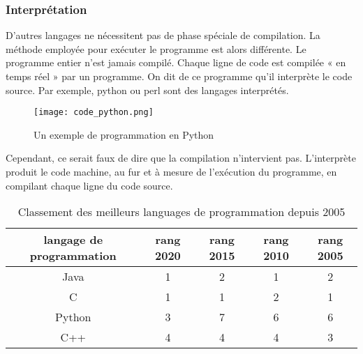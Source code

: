 \documentclass[12pt,a4paper]{article}
\begin{document}
    \subsubsection{Interprétation}
    D'autres langages ne nécessitent pas de phase spéciale de compilation. La méthode employée pour exécuter le programme est alors différente. Le programme entier n'est jamais compilé. Chaque ligne de code est compilée « en temps réel » par un programme. On dit de ce programme qu'il interprète le code source. Par exemple, python ou perl sont des langages interprétés.\\
    
    
    \begin{figure}[ht]
        \centering
        \texttt{[image: code\_python.png]}
        \caption{Un exemple de programmation en Python}
        \label{fig:Un exemple de programmation en Python}
    \end{figure}
    
    
    \newpage
    
    
    Cependant, ce serait faux de dire que la compilation n'intervient pas. 
    L'interprète produit le code machine, au fur et à mesure de l'exécution
    du programme, en compilant chaque ligne du code source.\\


    \begin{table}
        \centering
        \begin{tabular}{ c  c  c  c  c } \\ 
            \hline
            langage de programmation & rang 2020 & rang 2015 & rang 2010 & rang 2005 \\
            \hline
            Java    & 1 & 2 & 1 & 2 \\ 
            \hline
            C       & 1 & 1 & 2 & 1 \\ 
            \hline
            Python  & 3 & 7 & 6 & 6 \\ 
            \hline
            C++     & 4 & 4 & 4 & 3 \\ 
            \hline
        \end{tabular}
        \caption{Classement des meilleurs languages de programmation depuis 2005}
        \label{2}
    \end{table}
    
\end{document}
